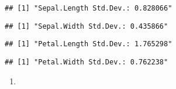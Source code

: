 \documentclass[]{article}
\newenvironment{Shaded}{\begin{snugshade}}{\end{snugshade}}
\newcommand{\KeywordTok}[1]{\textcolor[rgb]{0.13,0.29,0.53}{\textbf{#1}}}
\newcommand{\StringTok}[1]{\textcolor[rgb]{0.31,0.60,0.02}{#1}}
\newcommand{\OperatorTok}[1]{\textcolor[rgb]{0.81,0.36,0.00}{\textbf{#1}}}
\newcommand{\NormalTok}[1]{#1}
\begin{document}
\begin{Shaded}
\end{Shaded}

\begin{verbatim}
## [1] "Sepal.Length Std.Dev.: 0.828066"
\end{verbatim}

\begin{Shaded}
\end{Shaded}

\begin{verbatim}
## [1] "Sepal.Width Std.Dev.: 0.435866"
\end{verbatim}

\begin{Shaded}
\end{Shaded}

\begin{verbatim}
## [1] "Petal.Length Std.Dev.: 1.765298"
\end{verbatim}

\begin{Shaded}
\end{Shaded}

\begin{verbatim}
## [1] "Petal.Width Std.Dev.: 0.762238"
\end{verbatim}

\begin{enumerate}
\def\labelenumi{\alph{enumi})}
\setcounter{enumi}{2}
\item
\end{enumerate}
\end{document}
